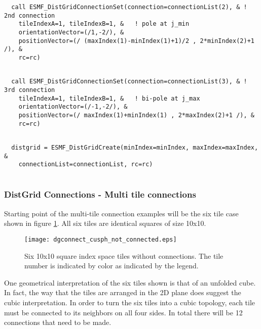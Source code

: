 
 \begin{verbatim}
  call ESMF_DistGridConnectionSet(connection=connectionList(2), & ! 2nd connection
    tileIndexA=1, tileIndexB=1, &   ! pole at j_min
    orientationVector=(/1,-2/), &
    positionVector=(/ (maxIndex(1)-minIndex(1)+1)/2 , 2*minIndex(2)+1 /), & 
    rc=rc)
 
\end{verbatim}
 

 \begin{verbatim}
  call ESMF_DistGridConnectionSet(connection=connectionList(3), & ! 3rd connection
    tileIndexA=1, tileIndexB=1, &   ! bi-pole at j_max
    orientationVector=(/-1,-2/), &
    positionVector=(/ maxIndex(1)+minIndex(1) , 2*maxIndex(2)+1 /), & 
    rc=rc)
 
\end{verbatim}
 

 \begin{verbatim}
  distgrid = ESMF_DistGridCreate(minIndex=minIndex, maxIndex=maxIndex, &
    connectionList=connectionList, rc=rc)
 
\end{verbatim}
 

   
   \subsubsection{DistGrid Connections - Multi tile connections}
   
   Starting point of the multi-tile connection examples will be the 
   six tile case shown in figure \ref{fig:dgconnect_cusph_not_connected}. 
   All six tiles are identical squares of size 10x10.
  
   \begin{figure}[h]
     \caption{Six 10x10 square index space tiles without connections. The tile
      number is indicated by color as indicated by the legend.}
     \centering
     \texttt{[image: dgconnect\_cusph\_not\_connected.eps]}
     \label{fig:dgconnect_cusph_not_connected}
   \end{figure}
  
   One geometrical interpretation of the six tiles shown is that of an unfolded 
   cube. In fact, the way that the tiles are arranged in the 2D plane does 
   suggest the cubic interpretation. In order to turn the six tiles into a 
   cubic topology, each tile must be connected to its neighbors on all four 
   sides. In total there will be 12 connections that need to be made.
  
